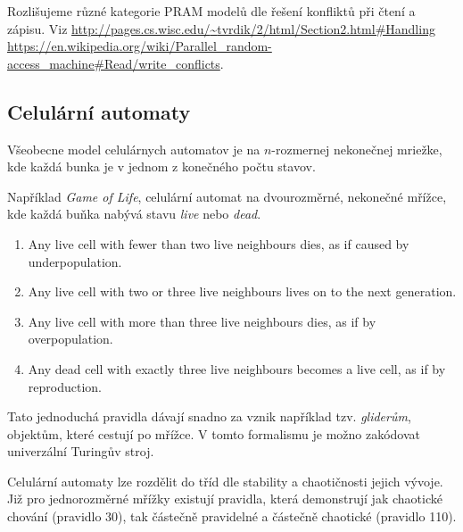 Rozlišujeme různé kategorie PRAM modelů dle řešení konfliktů při čtení a
zápisu. Viz
\href{http://pages.cs.wisc.edu/~tvrdik/2/html/Section2.html#Handling}{http://pages.cs.wisc.edu/{\textasciitilde}tvrdik/2/html/Section2.html\#Handling}\\
\href{https://en.wikipedia.org/wiki/Parallel_random-access_machine#Read/write_conflicts}{https://en.wikipedia.org/wiki/Parallel\_random-access\_machine\#Read/write\_conflicts}.

\subsection{Celulární automaty}

Všeobecne model celulárnych automatov je na $n$-rozmernej nekonečnej
mriežke, kde každá bunka je v jednom z konečného počtu stavov.

Například {\em Game of Life}, celulární automat na dvourozměrné, nekonečné
mřížce, kde každá buňka nabývá stavu {\em live} nebo {\em dead}.

\begin{enumerate}
    \item Any live cell with fewer than two live neighbours dies, as if caused by underpopulation.
    \item Any live cell with two or three live neighbours lives on to the next generation.
    \item Any live cell with more than three live neighbours dies, as if by overpopulation.
    \item Any dead cell with exactly three live neighbours becomes a live cell, as if by reproduction.
\end{enumerate}

Tato jednoduchá pravidla dávají snadno za vznik například tzv. {\em
gliderům}, objektům, které cestují po mřížce.
V tomto formalismu je možno zakódovat univerzální Turingův stroj.

Celulární automaty lze rozdělit do tříd dle stability a
chaotičnosti jejich vývoje. Již pro jednorozměrné
mřížky existují pravidla, která demonstrují jak chaotické chování
(pravidlo 30), tak částečně pravidelné a částečně chaotické (pravidlo
110).

